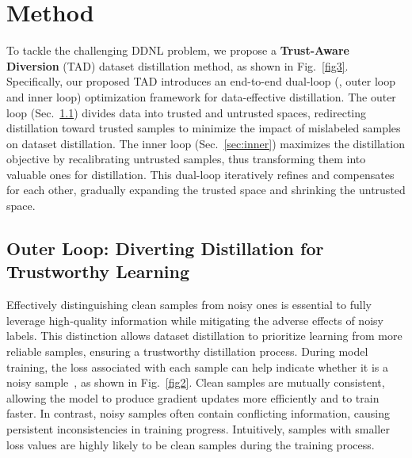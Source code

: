 \section{Method}

To tackle the challenging DDNL problem, we propose a \textbf{Trust-Aware Diversion} (TAD) dataset distillation method, as shown in Fig.~\ref{fig3}.
Specifically, our proposed TAD introduces an end-to-end dual-loop (\ie, outer loop and inner loop) optimization framework for data-effective distillation. 
The outer loop (Sec.~\ref{sec:outer}) divides data into trusted and untrusted spaces, redirecting distillation toward trusted samples to minimize the impact of mislabeled samples on dataset distillation.
The inner loop (Sec.~\ref{sec:inner}) maximizes the distillation objective by recalibrating untrusted samples, thus transforming them into valuable ones for distillation.
This dual-loop iteratively refines and compensates for each other, gradually expanding the trusted space and shrinking the untrusted space.


\subsection{Outer Loop: Diverting Distillation for Trustworthy Learning}
 \label{sec:outer}
 
Effectively distinguishing clean samples from noisy ones is essential to fully leverage high-quality information while mitigating the adverse effects of noisy labels.
This distinction allows dataset distillation to prioritize learning from more reliable samples, ensuring a trustworthy distillation process.
During model training, the loss associated with each sample can help indicate whether it is a noisy sample~\cite{li2020dividemix, wei2020combating, yao2020searching, zhou2020robust}, as shown in Fig.~\ref{fig2}.
Clean samples are mutually consistent, allowing the model to produce gradient updates more efficiently and to train faster. 
In contrast, noisy samples often contain conflicting information, causing persistent inconsistencies in training progress.
Intuitively, samples with smaller loss values are highly likely to be clean samples during the training process.


